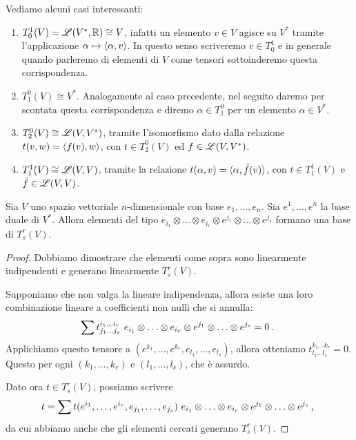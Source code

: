 \begin{example}
	Vediamo alcuni casi interessanti:
	\begin{enumerate}
		\item $T_0^1(V) = \mathscr L(V^*,\mathbb R) \cong V$, infatti un elemento $v\in V$ agisce su $V^*$ tramite l'applicazione $\alpha \mapsto \langle \alpha , v \rangle$. In questo senso scriveremo $v \in T_0^1$ e in generale quando parleremo di elementi di $V$ come tensori sottoinderemo questa corrispondenza.
		\item $T_1^0(V) \cong V^*$. Analogamente al caso precedente, nel seguito daremo per scontata questa corrispondenza e diremo $\alpha \in T_1^0$ per un elemento $\alpha \in V^*$.
		\item $T_2^0(V) \cong \mathscr L(V,V^*)$, tramite l'isomorfismo dato dalla relazione $t(v,w) = \langle f(v) , w \rangle$, con $t\in T_2^0(V)$ ed $f\in\mathscr L(V,V^*)$.
		\item $T_1^1(V) \cong \mathscr L(V,V)$, tramite la relazione $t(\alpha,v) = \langle \alpha , \tilde f (v) \rangle$, con $t\in T_1^1(V)$ e $\tilde f\in \mathscr L(V,V)$.
	\end{enumerate}
\end{example}

\begin{proposition}
	Sia $V$ uno spazio vettoriale $n$-dimensionale con base $e_1,\ldots,e_n$. Sia $e^1,\ldots,e^n$ la base duale di $V^*$. Allora elementi del tipo $e_{i_1}\otimes \ldots \otimes e_{i_r}\otimes e^{j_1}\otimes \ldots \otimes e^{j_s}$ formano una base di $T_s^r(V)$.
\end{proposition}
\begin{proof}
	Dobbiamo dimostrare che elementi come sopra sono linearmente indipendenti e generano linearmente $T_s^r(V)$.
	
	Supponiamo che non valga la lineare indipendenza, allora esiste una loro combinazione lineare a coefficienti non nulli che si annulla:
	\begin{equation*}
		\sum t_{j_1\ldots j_s}^{i_1\ldots i_r}\ e_{i_1}\otimes \ldots \otimes e_{i_r}\otimes e^{j_1}\otimes \ldots \otimes e^{j_s} = 0\punto
	\end{equation*}
	Applichiamo questo tensore a $(e^{k_1},\ldots,e^{k_r},e_{l_1},\ldots,e_{l_s})$, allora otteniamo $t_{l_1\ldots l_s}^{k_1 \ldots k_r} = 0$. Questo per ogni $(k_1,\ldots, k_r)$ e $(l_1,\ldots,l_s)$, che è assurdo.
	
	Dato ora $t\in T_s^r(V)$, possiamo scrivere
	\begin{equation*}
		t = \sum t(e^{i_1},\ldots, e^{i_r},e_{j_1},\ldots, e_{j_s})\ e_{i_1}\otimes \ldots \otimes e_{i_r}\otimes e^{j_1}\otimes \ldots \otimes e^{j_s}\, \text{, }
	\end{equation*}	
	da cui abbiamo anche che gli elementi cercati generano $T_s^r(V)$.
\end{proof}

